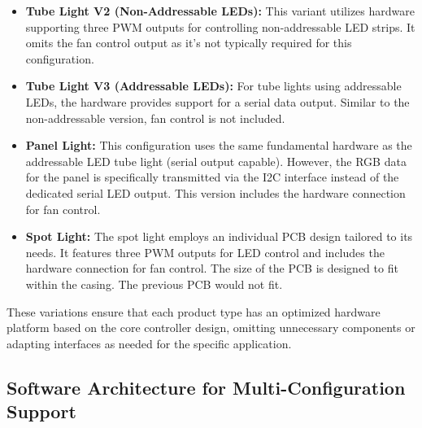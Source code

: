\begin{itemize}
	\item \textbf{Tube Light V2 (Non-Addressable \ac{LED}s):} This variant utilizes hardware supporting three \ac{PWM} outputs for controlling non-addressable \ac{LED} strips. It omits the fan control output as it's not typically required for this configuration.
	\item \textbf{Tube Light V3 (Addressable \ac{LED}s):} For tube lights using addressable \ac{LED}s, the hardware provides support for a serial data output. Similar to the non-addressable version, fan control is not included.
	\item \textbf{Panel Light:} This configuration uses the same fundamental hardware as the addressable \ac{LED} tube light (serial output capable). However, the \ac{RGB} data for the panel is specifically transmitted via the \ac{I2C} interface instead of the dedicated serial \ac{LED} output. This version includes the hardware connection for fan control.
	\item \textbf{Spot Light:} The spot light employs an individual \ac{PCB} design tailored to its needs. It features three \ac{PWM} outputs for \ac{LED} control and includes the hardware connection for fan control.
	The size of the \ac{PCB} is designed to fit within the casing. The previous \ac{PCB} would not fit.
\end{itemize}

These variations ensure that each product type has an optimized hardware platform based on the core controller design, omitting unnecessary components or adapting interfaces as needed for the specific application.

\subsection{Software Architecture for Multi-Configuration Support}
